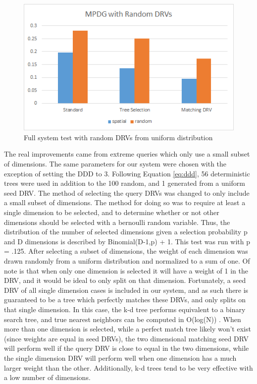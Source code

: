 \begin{figure}[h]
\begin{center}
\includegraphics[width=.85\textwidth]{Figures/fullsysrand}
\end{center}
\caption{Full system test with random DRVs from uniform distribution}
\label{fig:fullsysrand}
\end{figure}

The real improvements came from extreme queries which only use a small subset of dimensions.  The same parameters for our system were chosen with the exception of setting the DDD to 3.  Following Equation \ref{eq:ddd}, 56 deterministic trees were used in addition to the 100 random, and 1 generated from a uniform seed DRV.  The method of selecting the query DRVs was changed to only include a small subset of dimensions.  The method for doing so was to require at least a single dimension to be selected, and to determine whether or not other dimensions should be selected with a bernoulli random variable.  Thus, the distribution of the number of selected dimensions given a selection probability p and D dimensions is described by Binomial(D-1,p) + 1.  This test was run with p = .125.  After selecting a subset of dimensions, the weight of each dimension was drawn randomly from a uniform distribution and normalized to a sum of one.  Of note is that when only one dimension is selected it will have a weight of 1 in the DRV, and it would be ideal to only split on that dimension.  Fortunately, a seed DRV of all single dimension cases is included in our system, and as such there is guaranteed to be a tree which perfectly matches these DRVs, and only splits on that single dimension.  In this case, the k-d tree performs equivalent to a binary search tree, and true nearest neighbors can be computed in O(log(N)) \citep{ahmadbinary}.  When more than one dimension is selected, while a perfect match tree likely won't exist (since weights are equal in seed DRVs), the two dimensional matching seed DRV will perform well if the query DRV is close to equal in the two dimensions, while the single dimension DRV will perform well when one dimension has a much larger weight than the other.  Additionally, k-d trees tend to be very effective with a low number of dimensions.

